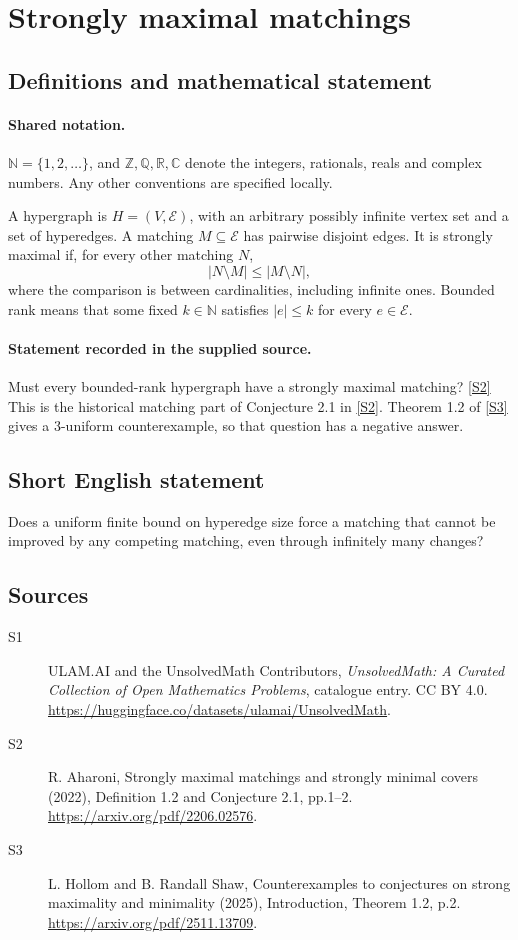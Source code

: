 \documentclass[11pt]{article}
\newcommand{\sref}[2]{\hyperlink{source:#1:#2}{[S#2]}}
\begin{document}
\section{Strongly maximal matchings}\label{statement}

\subsection{Definitions and mathematical statement}

\paragraph{Shared notation.}$\mathbb N=\{1,2,\ldots\}$, and $\mathbb Z,\mathbb Q,\mathbb R,\mathbb C$ denote the integers, rationals, reals and complex numbers. Any other conventions are specified locally.


A hypergraph is $H=(V,\mathcal E)$, with an arbitrary possibly infinite vertex set and a set of hyperedges. A matching $M\subseteq\mathcal E$ has pairwise disjoint edges. It is strongly maximal if, for every other matching $N$, \[|N\setminus M|\le |M\setminus N|,\] where the comparison is between cardinalities, including infinite ones. Bounded rank means that some fixed $k\in\mathbb N$ satisfies $|e|\le k$ for every $e\in\mathcal E$.
\paragraph{Statement recorded in the supplied source.}
Must every bounded-rank hypergraph have a strongly maximal matching? \sref{statement}{2}
This is the historical matching part of Conjecture 2.1 in \sref{statement}{2}. Theorem 1.2 of \sref{statement}{3} gives a 3-uniform counterexample, so that question has a negative answer.
\subsection{Short English statement}
Does a uniform finite bound on hyperedge size force a matching that cannot be improved by any competing matching, even through infinitely many changes?
\subsection{Sources}
\begin{description}
\item[\hypertarget{source:statement:1}{S1}] ULAM.AI and the UnsolvedMath Contributors, \emph{UnsolvedMath: A Curated Collection of Open Mathematics Problems}, catalogue entry. CC BY 4.0. \url{https://huggingface.co/datasets/ulamai/UnsolvedMath}.
\item[\hypertarget{source:statement:2}{S2}] R. Aharoni, Strongly maximal matchings and strongly minimal covers (2022), Definition 1.2 and Conjecture 2.1, pp.1--2. \url{https://arxiv.org/pdf/2206.02576}.
\item[\hypertarget{source:statement:3}{S3}] L. Hollom and B. Randall Shaw, Counterexamples to conjectures on strong maximality and minimality (2025), Introduction, Theorem 1.2, p.2. \url{https://arxiv.org/pdf/2511.13709}.
\end{description}
\label{end:statement}
\end{document}
